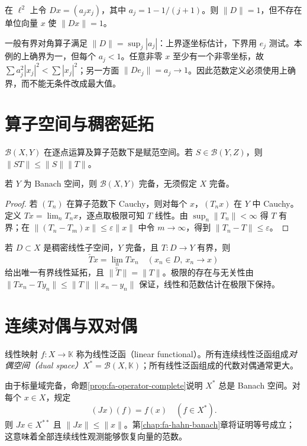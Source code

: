 \begin{example}[上确界未必达到]
在 $\ell^2$ 上令 $Dx=(a_jx_j)$，其中 $a_j=1-1/(j+1)$。则 $\|D\|=1$，但不存在单位向量 $x$ 使 $\|Dx\|=1$。
\end{example}
\begin{solve}
一般有界对角算子满足 $\|D\|=\sup_j|a_j|$：上界逐坐标估计，下界用 $e_j$ 测试。本例的上确界为一，但每个 $a_j<1$。任意非零 $x$ 至少有一个非零坐标，故 $\sum a_j^2|x_j|^2<\sum|x_j|^2$；另一方面 $\|De_j\|=a_j\to1$。因此范数定义必须使用上确界，而不能无条件改成最大值。
\end{solve}

\section{算子空间与稠密延拓}
$\mathcal B(X,Y)$ 在逐点运算及算子范数下是赋范空间。若 $S\in\mathcal B(Y,Z)$，则 $\|ST\|\leq\|S\|\|T\|$。
\begin{proposition}\label{prop:fa-operator-complete}
若 $Y$ 为 Banach 空间，则 $\mathcal B(X,Y)$ 完备，无须假定 $X$ 完备。
\end{proposition}
\begin{proof}
若 $(T_n)$ 在算子范数下 Cauchy，则对每个 $x$，$(T_nx)$ 在 $Y$ 中 Cauchy。定义 $Tx=\lim_nT_nx$，逐点取极限可知 $T$ 线性。由 $\sup_n\|T_n\|<\infty$ 得 $T$ 有界；在 $\|(T_n-T_m)x\|\leq\varepsilon\|x\|$ 中令 $m\to\infty$，得到 $\|T_n-T\|\leq\varepsilon$。
\end{proof}
若 $D\subset X$ 是稠密线性子空间，$Y$ 完备，且 $T:D\to Y$ 有界，则
\[
 \widetilde T x=\lim_nTx_n\quad(x_n\in D,\ x_n\to x)
\]
给出唯一有界线性延拓，且 $\|\widetilde T\|=\|T\|$。极限的存在与无关性由 $\|Tx_n-Ty_n\|\leq\|T\|\|x_n-y_n\|$ 保证，线性和范数估计在极限下保持。

\section{连续对偶与双对偶}
\begin{definition}
线性映射 $f:X\to\mathbb K$ 称为线性泛函（linear functional）。所有连续线性泛函组成\emph{对偶空间（dual space）}$X^*=\mathcal B(X,\mathbb K)$；所有线性泛函组成的代数对偶通常更大。
\end{definition}
由于标量域完备，命题\ref{prop:fa-operator-complete}说明 $X^*$ 总是 Banach 空间。对每个 $x\in X$，规定
\[
 (Jx)(f)=f(x)\quad(f\in X^*).
\]
则 $Jx\in X^{**}$ 且 $\|Jx\|\leq\|x\|$。第\ref{chap:fa-hahn-banach}章将证明等号成立；这意味着全部连续线性观测能够恢复向量的范数。


